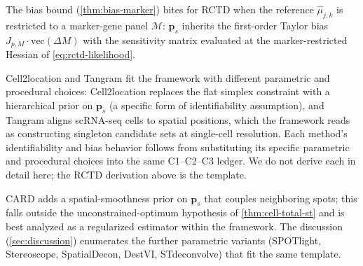 The bias bound (\cref{thm:bias-marker}) bites for RCTD when the
reference $\hat\mu_{j,k}$ is restricted to a marker-gene panel
$\mathcal M$: $\hat{\bm p}_s$ inherits the first-order Taylor bias
$J_{p,M}\cdot\mathrm{vec}(\Delta M)$ with the sensitivity matrix
evaluated at the marker-restricted Hessian of
\eqref{eq:rctd-likelihood}.

Cell2location and Tangram fit the framework with different
parametric and procedural choices: Cell2location replaces the flat
simplex constraint with a hierarchical prior on $\bm p_s$ (a
specific form of identifiability assumption), and Tangram aligns
scRNA-seq cells to spatial positions, which the framework reads as
constructing singleton candidate sets at single-cell resolution.
Each method's identifiability and bias behavior follows from
substituting its specific parametric and procedural choices into the
same C1--C2--C3 ledger. We do not derive each in detail here; the
RCTD derivation above is the template.

CARD adds a spatial-smoothness prior on $\bm p_s$ that couples
neighboring spots; this falls outside the unconstrained-optimum
hypothesis of \cref{thm:cell-total-st} and is best analyzed as a
regularized estimator within the framework. The discussion
(\cref{sec:discussion}) enumerates the further parametric variants
(SPOTlight, Stereoscope, SpatialDecon, DestVI, STdeconvolve) that
fit the same template.
